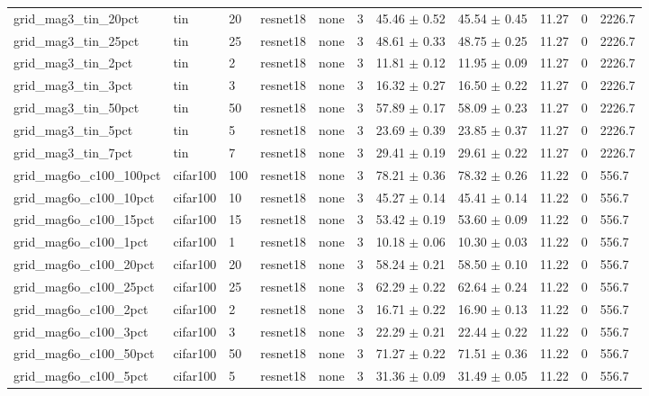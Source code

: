 \begin{tabular}{lllllllllll}
grid_mag3_tin_20pct & tin & 20 & resnet18 & none & 3 & 45.46 $\pm$ 0.52 & 45.54 $\pm$ 0.45 & 11.27 & 0 & 2226.7 \\
grid_mag3_tin_25pct & tin & 25 & resnet18 & none & 3 & 48.61 $\pm$ 0.33 & 48.75 $\pm$ 0.25 & 11.27 & 0 & 2226.7 \\
grid_mag3_tin_2pct & tin & 2 & resnet18 & none & 3 & 11.81 $\pm$ 0.12 & 11.95 $\pm$ 0.09 & 11.27 & 0 & 2226.7 \\
grid_mag3_tin_3pct & tin & 3 & resnet18 & none & 3 & 16.32 $\pm$ 0.27 & 16.50 $\pm$ 0.22 & 11.27 & 0 & 2226.7 \\
grid_mag3_tin_50pct & tin & 50 & resnet18 & none & 3 & 57.89 $\pm$ 0.17 & 58.09 $\pm$ 0.23 & 11.27 & 0 & 2226.7 \\
grid_mag3_tin_5pct & tin & 5 & resnet18 & none & 3 & 23.69 $\pm$ 0.39 & 23.85 $\pm$ 0.37 & 11.27 & 0 & 2226.7 \\
grid_mag3_tin_7pct & tin & 7 & resnet18 & none & 3 & 29.41 $\pm$ 0.19 & 29.61 $\pm$ 0.22 & 11.27 & 0 & 2226.7 \\
grid_mag6o_c100_100pct & cifar100 & 100 & resnet18 & none & 3 & 78.21 $\pm$ 0.36 & 78.32 $\pm$ 0.26 & 11.22 & 0 & 556.7 \\
grid_mag6o_c100_10pct & cifar100 & 10 & resnet18 & none & 3 & 45.27 $\pm$ 0.14 & 45.41 $\pm$ 0.14 & 11.22 & 0 & 556.7 \\
grid_mag6o_c100_15pct & cifar100 & 15 & resnet18 & none & 3 & 53.42 $\pm$ 0.19 & 53.60 $\pm$ 0.09 & 11.22 & 0 & 556.7 \\
grid_mag6o_c100_1pct & cifar100 & 1 & resnet18 & none & 3 & 10.18 $\pm$ 0.06 & 10.30 $\pm$ 0.03 & 11.22 & 0 & 556.7 \\
grid_mag6o_c100_20pct & cifar100 & 20 & resnet18 & none & 3 & 58.24 $\pm$ 0.21 & 58.50 $\pm$ 0.10 & 11.22 & 0 & 556.7 \\
grid_mag6o_c100_25pct & cifar100 & 25 & resnet18 & none & 3 & 62.29 $\pm$ 0.22 & 62.64 $\pm$ 0.24 & 11.22 & 0 & 556.7 \\
grid_mag6o_c100_2pct & cifar100 & 2 & resnet18 & none & 3 & 16.71 $\pm$ 0.22 & 16.90 $\pm$ 0.13 & 11.22 & 0 & 556.7 \\
grid_mag6o_c100_3pct & cifar100 & 3 & resnet18 & none & 3 & 22.29 $\pm$ 0.21 & 22.44 $\pm$ 0.22 & 11.22 & 0 & 556.7 \\
grid_mag6o_c100_50pct & cifar100 & 50 & resnet18 & none & 3 & 71.27 $\pm$ 0.22 & 71.51 $\pm$ 0.36 & 11.22 & 0 & 556.7 \\
grid_mag6o_c100_5pct & cifar100 & 5 & resnet18 & none & 3 & 31.36 $\pm$ 0.09 & 31.49 $\pm$ 0.05 & 11.22 & 0 & 556.7 \\

\end{tabular}
